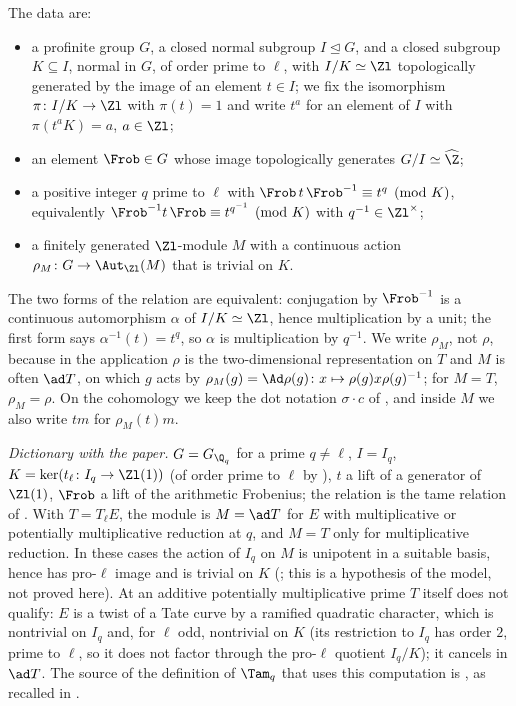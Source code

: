 \begin{construction}\label{constr:cohomology:model}
The data are:
\begin{itemize}
\item a profinite group $G$, a closed normal subgroup $I\trianglelefteq G$, and a closed subgroup $K\subseteq I$, normal in $G$, of order prime to $\ell$, with $I/K\simeq\Zl$
topologically generated by the image of an element $t\in I$; we fix the isomorphism $\pi\colon I/K\to\Zl$ with $\pi(t)=1$ and write $t^a$ for an element of $I$ with
$\pi(t^aK)=a$, $a\in\Zl$;
\item an element $\Frob\in G$ whose image topologically generates $G/I\simeq\widehat\Z$;
\item \sloppy a positive integer $q$ prime to $\ell$ with $\Frob\,t\,\Frob^{-1}\equiv t^q\pmod K$, equivalently $\Frob^{-1}t\,\Frob\equiv t^{q^{-1}}\pmod K$ with $q^{-1}\in\Zl^\times$;
\item a finitely generated $\Zl$-module $M$ with a continuous action $\rho_M\colon G\to\Aut_{\Zl}(M)$ that is trivial on $K$.
\end{itemize}
The two forms of the relation are equivalent: conjugation by $\Frob^{-1}$ is a continuous automorphism $\alpha$ of $I/K\simeq\Zl$, hence multiplication by a unit;
the first form says $\alpha^{-1}(t)=t^q$, so $\alpha$ is multiplication by $q^{-1}$.
We write $\rho_M$, not $\rho$, because in the application $\rho$ is the two-dimensional representation on $T$ and $M$ is often $\ad T$, on which $g$ acts by
$\rho_M(g)=\Ad\rho(g)\colon x\mapsto\rho(g)x\rho(g)^{-1}$; for $M=T$, $\rho_M=\rho$. On the cohomology we keep the dot notation $\sigma\cdot c$ of
, and inside $M$ we also write $tm$ for $\rho_M(t)m$.

\emph{Dictionary with the paper.} $G=G_{\Q_q}$ for a prime $q\ne\ell$, $I=I_q$, $K=\ker(t_\ell\colon I_q\to\Zl(1))$ (of order prime to $\ell$ by ), $t$
a lift of a generator of $\Zl(1)$, $\Frob$ a lift of the arithmetic Frobenius; the relation is the tame relation of . With $T=T_\ell E$, the module is
$M=\ad T$ for $E$ with multiplicative or potentially multiplicative reduction at $q$, and $M=T$ only for multiplicative reduction. In these cases the action of $I_q$ on
$M$ is unipotent in a suitable basis, hence has pro-$\ell$ image and is trivial on $K$ (; this is a hypothesis of the model, not proved here). At an
additive potentially multiplicative prime $T$ itself does not qualify: $E$ is a twist of a Tate curve by a ramified quadratic character, which is nontrivial on $I_q$ and,
for $\ell$ odd, nontrivial on $K$ (its restriction to $I_q$ has order $2$, prime to $\ell$, so it does not factor through the pro-$\ell$ quotient $I_q/K$); it cancels in
$\ad T$. The source of the definition of $\Tam_q$ that
uses this computation is \cite[I.4.2.2]{FPR94}, as recalled in \cite[p.~708]{DFG04}.
\end{construction}

